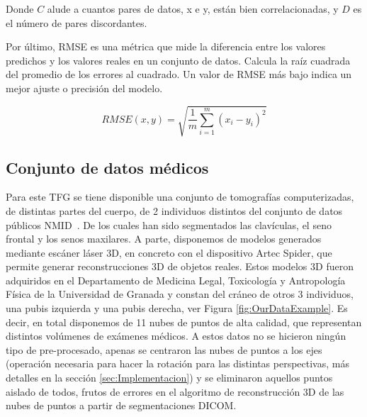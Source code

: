 Donde $C$ alude a cuantos pares de datos, x e y, están bien correlacionadas, 
y $D$ es el número de pares discordantes.  

Por último, RMSE es una métrica que mide la diferencia entre los valores 
predichos y los valores reales en un conjunto de datos. 
Calcula la raíz cuadrada del promedio de los errores al cuadrado. 
Un valor de RMSE más bajo indica un mejor ajuste o precisión del modelo.

\begin{equation}
  RMSE(x,y) = \sqrt{\frac{1}{m}\sum_{i=1}^m (x_i - y_i)^2}
\label{eq:RMSE}
\end{equation}

\subsection{Conjunto de datos médicos}
\label{sec:OurData}
Para este TFG se tiene disponible una conjunto de tomografías computerizadas, de distintas
partes del cuerpo, de 2 individuos distintos del conjunto de datos públicos NMID~\cite{NMID}. 
De los cuales han sido segmentados las clavículas, el seno frontal y los senos maxilares. 
A parte, disponemos de modelos generados mediante escáner láser 3D, en concreto con el dispositivo Artec Spider, que permite generar reconstrucciones 3D de objetos reales. Estos modelos 3D fueron adquiridos en el Departamento de Medicina Legal, Toxicología y Antropología Física de la Universidad de Granada y constan del cráneo de otros 3 individuos, una pubis izquierda y
una pubis derecha, ver Figura \ref{fig:OurDataExample}. Es decir, en total disponemos de 11 nubes de puntos de alta 
calidad, que representan distintos volúmenes de exámenes médicos.
A estos datos no se hicieron ningún tipo de pre-procesado, apenas se centraron 
las nubes de puntos a los ejes (operación necesaria para hacer la rotación para 
las distintas perspectivas, más detalles en la sección \ref{sec:Implementacion})
y se eliminaron aquellos puntos aislado de todos, frutos de errores en el 
algoritmo de reconstrucción 3D de las nubes de puntos a partir de segmentaciones DICOM. 

